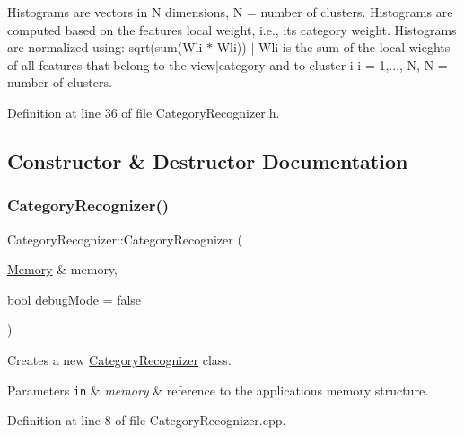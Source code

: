 Histograms are vectors in N dimensions, N = number of clusters. Histograms are computed based on the features\textquotesingle{} local weight, i.\+e., its\textquotesingle{} category weight. Histograms are normalized using\+: sqrt(sum(\+Wli $\ast$ Wli)) $\vert$ Wli is the sum of the local wieghts of all features that belong to the view$\vert$category and to cluster i i = 1,..., N, N = number of clusters. 

Definition at line 36 of file Category\+Recognizer.\+h.



\subsection{Constructor \& Destructor Documentation}
\mbox{\label{class_category_recognizer_a67c56c30b0cb2783842c53169e7176c4}} 
\subsubsection{\texorpdfstring{Category\+Recognizer()}{CategoryRecognizer()}}
{\footnotesize\ttfamily Category\+Recognizer\+::\+Category\+Recognizer (\begin{DoxyParamCaption}\item[{\hyperlink{class_memory}{Memory} \&}]{memory,  }\item[{bool}]{debug\+Mode = {\ttfamily false} }\end{DoxyParamCaption})}

Creates a new \hyperlink{class_category_recognizer}{Category\+Recognizer} class.


\begin{DoxyParams}[1]{Parameters}
\mbox{\tt in}  & {\em memory} & reference to the applications\textquotesingle{} memory structure. \\
\hline
\end{DoxyParams}


Definition at line 8 of file Category\+Recognizer.\+cpp.

\mbox{\label{class_category_recognizer_a0b47f145ff89da44fa5191a52a6c558a}} 
